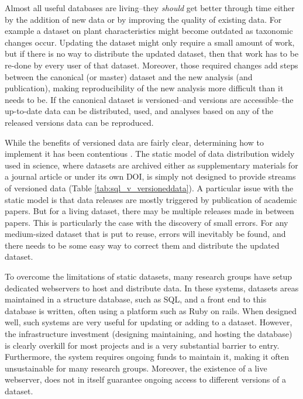 \documentclass[a4paper,11pt]{article}
\begin{document}
Almost all useful databases are living--they \emph{should} get better
through time either by the addition of new data or by improving the
quality of existing data. For example a dataset on plant characteristics
might become outdated as taxonomic changes occur. Updating the dataset might only
require a small amount of work, but if there is no
way to distribute the updated dataset, then that work has to be re-done by
every user of that dataset. Moreover, those required changes add steps
between the canonical (or master) dataset and the new analysis (and publication),
making reproducibility of the new analysis more difficult than it needs
to be. If the canonical dataset is versioned--and versions are
accessible--the up-to-date data can be distributed, used, and analyses
based on any of the released versions data can be reproduced.  

While the benefits of versioned data are fairly clear, determining how to implement it has been contentious . The static model of data distribution widely used in science, where datasets are archived either as supplementary materials for a journal article
or under its own DOI, is simply not designed to provide streams of versioned
data (Table \ref{tab:sql_v_versioneddata}). A particular issue with the static
model is that data releases are mostly triggered by publication of academic
papers. But for a living dataset, there may be multiple releases made in
between papers. This is particularly the case with the discovery of small
errors. For any medium-sized dataset that is put to reuse, errors will
inevitably be found, and there needs to be some easy  way to correct them and
distribute the updated dataset.

To overcome the limitations of static datasets, many research groups have
setup dedicated webservers to host and distribute data. In these systems,
datasets areas maintained in a structure database, such as SQL, and a front
end to this database is written, often using a platform such as Ruby on rails.
When designed well, such systems are very useful for updating or adding to a
dataset. However, the infrastructure investment (designing maintaining, and
hosting the database) is clearly overkill for most projects and is a very
substantial barrier to entry. Furthermore, the system requires ongoing funds to maintain it, making it often unsustainable for many research groups. Moreover, the existence of a live webserver,
does not in itself guarantee ongoing access to different versions of a
dataset.
\end{document}
